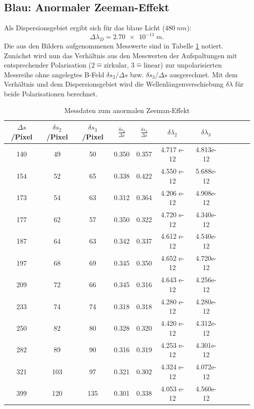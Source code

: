 \subsection{Blau: Anormaler Zeeman-Effekt}
Als Dispersionsgebiet ergibt sich für das blaue Licht ($\SI{480}{nm}$):
\begin{equation*}
  \Delta \lambda_D = \SI{2.70e-11}{m}.
\end{equation*}
Die aus den Bildern aufgenommenen Messwerte sind in Tabelle \ref{tab:blau} notiert.
Zunächst wird nun das Verhältnis aus den Messwerten der Aufspaltungen mit entsprechender Polarisation ($2 \widehat{=} \text{zirkular}$, $3 \widehat{=} \text{linear}$) zur unpolarisierten Messreihe ohne angelegtes B-Feld $\delta s_{2}/\Delta s$ bzw. $\delta s_{3}/ \Delta s$ ausgerechnet.
Mit dem Verhältnis und dem Dispersionsgebiet wird die Wellenlängenverschiebung $\delta \lambda$ für beide Polarisationen berechnet.
%
%
\begin{table}[h!]
  \centering
  \caption{Messdaten zum anormalen Zeeman-Effekt}
  \label{tab:blau}
  \begin{tabular}{c c c c c c c c c c c}
    \toprule

      $\Delta s$/Pixel & $\delta s_{2}$/Pixel & $\delta s_{3}$/Pixel & $\frac{\delta s_{2}}{\Delta s}$ & $\frac{\delta s_{3}}{\Delta s}$  & $ \delta \lambda_{2} $ &  $\delta \lambda_{3}$    \\
      \midrule
      140   &   49    &   50    &   0.350   &     0.357     &   4.717 e-12   & 4.813e-12  \\
      154   &   52    &   65    &   0.338   &     0.422     &   4.550 e-12   & 5.688e-12  \\
      173   &   54    &   63    &   0.312   &     0.364     &   4.206 e-12   & 4.908e-12  \\
      177   &   62    &   57    &   0.350   &     0.322     &   4.720 e-12   & 4.340e-12  \\
      187   &   64    &   63    &   0.342   &     0.337     &   4.612 e-12   & 4.540e-12  \\
      197   &   68    &   69    &   0.345   &     0.350     &   4.652 e-12   & 4.720e-12  \\
      209   &   72    &   66    &   0.345   &     0.316     &   4.643 e-12   & 4.256e-12  \\
      233   &   74    &   74    &   0.318   &     0.318     &   4.280 e-12   & 4.280e-12  \\
      250   &   82    &   80    &   0.328   &     0.320     &   4.420 e-12   & 4.312e-12  \\
      282   &   89    &   90    &   0.316   &     0.319     &   4.253 e-12   & 4.301e-12  \\
      321   &   103   &   97    &   0.321   &     0.302     &   4.324 e-12   & 4.072e-12  \\
      399   &   120   &   135   &   0.301   &     0.338     &   4.053 e-12   & 4.560e-12  \\
    \bottomrule
  \end{tabular}
\end{table}
